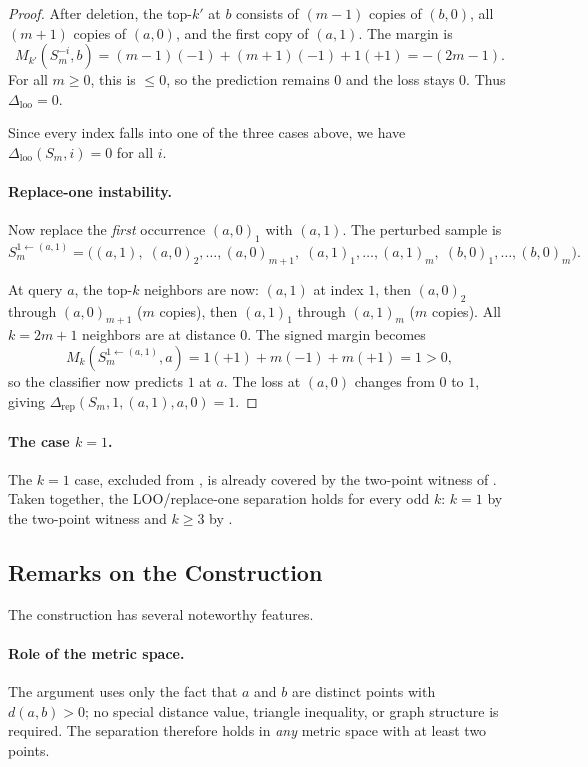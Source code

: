 \begin{proof}
After deletion, the top-$k'$ at $b$ consists of $(m-1)$ copies of $(b,0)$,
all $(m+1)$ copies of $(a,0)$, and the first copy of $(a,1)$. The margin is
\[
M_{k'}(S_m^{-i}, b) = (m-1)(-1) + (m+1)(-1) + 1(+1) = -(2m-1).
\]
For all $m \ge 0$, this is $\le 0$, so the prediction remains $0$ and the
loss stays $0$. Thus $\Delta_{\mathrm{loo}} = 0$.

Since every index falls into one of the three cases above, we have
$\Delta_{\mathrm{loo}}(S_m, i) = 0$ for all $i$.

\paragraph{Replace-one instability.}
Now replace the {\em first} occurrence $(a,0)_1$ with $(a,1)$. The perturbed
sample is
\[
S_m^{1 \leftarrow (a,1)} = \big((a,1),\; (a,0)_2,\ldots,(a,0)_{m+1},\;
                             (a,1)_1,\ldots,(a,1)_m,\;
                             (b,0)_1,\ldots,(b,0)_m\big).
\]

At query $a$, the top-$k$ neighbors are now: $(a,1)$ at index $1$, then
$(a,0)_2$ through $(a,0)_{m+1}$ ($m$ copies), then $(a,1)_1$ through
$(a,1)_m$ ($m$ copies). All $k = 2m+1$ neighbors are at distance $0$. The
signed margin becomes
\[
M_k(S_m^{1 \leftarrow (a,1)}, a) = 1(+1) + m(-1) + m(+1) = 1 > 0,
\]
so the classifier now predicts $1$ at $a$. The loss at $(a,0)$ changes from
$0$ to $1$, giving $\Delta_{\mathrm{rep}}(S_m, 1, (a,1), a, 0) = 1$.
\end{proof}

\paragraph{The case $k=1$.}
The $k=1$ case, excluded from , is already covered by the two-point witness of .  Taken together, the LOO/replace-one separation holds for every odd $k$: $k=1$ by the two-point witness and $k \ge 3$ by .

\subsection{Remarks on the Construction}

The construction has several noteworthy features.

\paragraph{Role of the metric space.} The argument uses only the fact that
$a$ and $b$ are distinct points with $d(a,b) > 0$; no special distance value,
triangle inequality, or graph structure is required. The separation therefore
holds in {\em any} metric space with at least two points.

